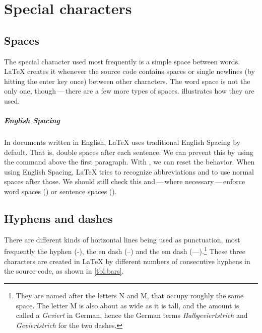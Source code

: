 \chapter{Special characters}

\label{sec:special-characters}

\section{Spaces}

The special character used most frequently is a simple space between words.
\LaTeX{} creates it whenever the source code contains spaces or single newlines (by hitting the enter key once) between other characters.
The word space is not the only one, though\,---\,there are a few more types of spaces.
 illustrates how they are used.


\paragraph{English Spacing}
In documents written in English, \LaTeX{} uses traditional English Spacing by default. That is, double spaces after each sentence.
We can prevent this by using the command  above the first paragraph.
With , we can reset the behavior.
When using English Spacing, \LaTeX{} tries to recognize abbreviations and to use normal spaces after those.
We should still check this and\,---\,where necessary\,---\,enforce word spaces () or sentence spaces ().

\section{Hyphens and dashes}
There are different kinds of horizontal lines being used as punctuation,
most frequently the hyphen (-), the en dash (–) and the em dash (—).\footnote{They are named after the letters N and M,
that occupy roughly the same space.
The letter M is also about as wide as it is tall, and the amount is called a \emph{Geviert} in German, hence the German terms \emph{Halbgeviertstrich} and \emph{Geviertstrich} for the two dashes.}
These three characters are created in \LaTeX{} by different numbers of consecutive hyphens in the source code,
as shown in \cref{tbl:bars}.

